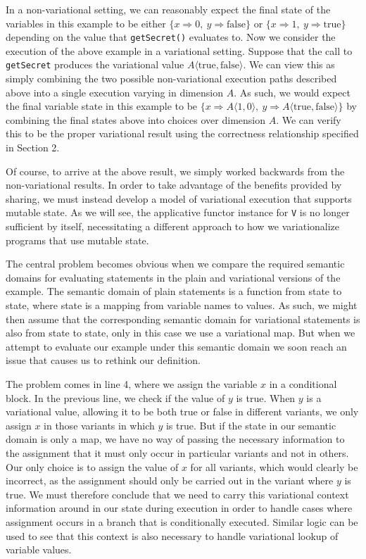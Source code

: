 \documentclass[letterpaper,10pt,onecolumn]{article}
\newcommand{\prog}[1]{{\small\texttt{#1}}}
\newcommand{\tagtree}[3]{#1 \langle #2, #3 \rangle}
\begin{document}
In a non-variational setting, we can reasonably expect the final state of the variables in this example
to be either $\{x \Rightarrow 0,\ y \Rightarrow \text{false}\}$ or
$\{x \Rightarrow 1,\ y \Rightarrow \text{true}\}$ depending on the value that
\prog{getSecret()} evaluates to. Now we consider the execution of the above example in a variational
setting. Suppose that the call to \prog{getSecret}
produces the variational value $\tagtree{A}{\text{true}}{\text{false}}$. We can view this as simply
combining the two possible non-variational execution paths described above into a
single execution varying in dimension $A$. As such, we would expect the final variable state
in this example to be  $\{x \Rightarrow \tagtree{A}{1}{0},\ y \Rightarrow \tagtree{A}{\text{true}}{\text{false}}\}$ by combining the final states above into choices over dimension $A$. We can verify this to be the proper variational result using the correctness relationship
specified in Section 2.

Of course, to arrive at the above result, we simply worked backwards from the non-variational
results. In order to take advantage of the benefits provided by sharing, we must instead develop a model
of variational execution that supports mutable state.  As we will see, the applicative functor instance for
\prog{V} is no longer sufficient by itself, necessitating a different approach to how we variationalize programs
that use mutable state.

The central problem becomes obvious when we compare the required semantic domains for evaluating statements
in the plain and variational versions of the example. The semantic domain of plain statements is a function from state to
state, where state is a mapping from variable names to values. As such, we might then assume that the corresponding
semantic domain for variational statements is also from state to state, only in this case we use a variational map. But when
we attempt to evaluate our example under this semantic domain we soon reach an issue that causes us to rethink our definition.

The problem comes in line 4, where we assign the variable $x$ in a conditional block. In the previous line, we check if the value of
$y$ is true. When $y$ is a variational value, allowing it to be both true or false in different variants, we only assign $x$ in those variants
in which $y$ is true. But if the state in our semantic domain is only a map, we have no way of passing the necessary information to the
assignment that it must only occur in particular variants and not in others. Our only choice is to assign the value of $x$ for all variants,
which would clearly be incorrect, as the assignment should only be carried out in the variant where $y$ is true. We must therefore
conclude that we need to carry this variational context information around in our state during execution in order to handle cases where
assignment occurs in a branch that is conditionally executed. Similar logic can be used to see that this context is also necessary to handle
variational lookup of variable values.
\end{document}
